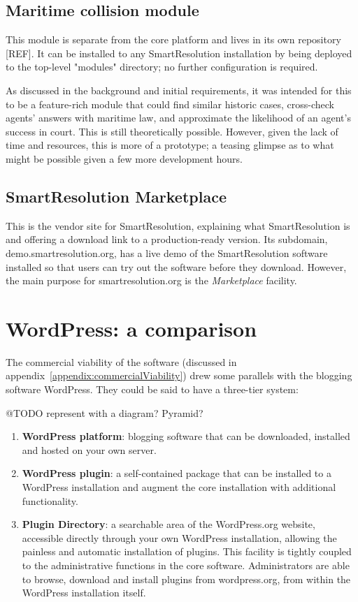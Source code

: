 \subsection{Maritime collision module}

This module is separate from the core platform and lives in its own repository [REF]. It can be installed to any SmartResolution installation by being deployed to the top-level "modules" directory; no further configuration is required.

As discussed in the background and initial requirements, it was intended for this to be a feature-rich module that could find similar historic cases, cross-check agents' answers with maritime law, and approximate the likelihood of an agent's success in court. This is still theoretically possible. However, given the lack of time and resources, this is more of a prototype; a teasing glimpse as to what might be possible given a few more development hours.

\subsection{SmartResolution Marketplace}

This is the vendor site for SmartResolution, explaining what SmartResolution is and offering a download link to a production-ready version. Its subdomain, demo.smartresolution.org, has a live demo of the SmartResolution software installed so that users can try out the software before they download. However, the main purpose for smartresolution.org is the \emph{Marketplace} facility.

\section{WordPress: a comparison}

The commercial viability of the software (discussed in appendix~\ref{appendix:commercialViability}) drew some parallels with the blogging software WordPress. They could be said to have a three-tier system:

@TODO represent with a diagram? Pyramid?

\begin{enumerate}
    \item \textbf{WordPress platform}: blogging software that can be downloaded, installed and hosted on your own server.
    
    \item \textbf{WordPress plugin}: a self-contained package that can be installed to a WordPress installation and augment the core installation with additional functionality.
    
    \item \textbf{Plugin Directory}: a searchable area of the WordPress.org website, accessible directly through your own WordPress installation, allowing the painless and automatic installation of plugins. This facility is tightly coupled to the administrative functions in the core software. Administrators are able to browse, download and install plugins from wordpress.org, from within the WordPress installation itself. %
\end{enumerate}

